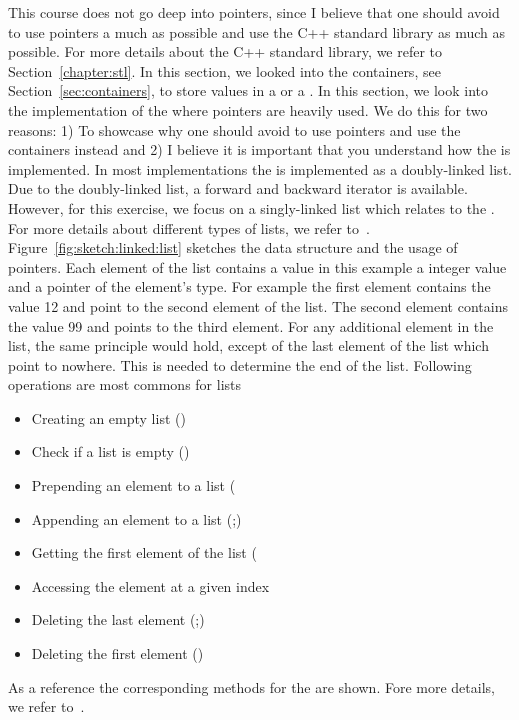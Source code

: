 This course does not go deep into pointers, since I believe that one should avoid to use pointers a much as possible and use the C++ standard library as much as possible. For more details about the C++ standard library, we refer to Section~\ref{chapter:stl}. In this section, we looked into the containers, see Section~\ref{sec:containers}, to store values in a  or a . In this section, we look into the implementation of the  where pointers are heavily used. We do this for two reasons: 1) To showcase why one should avoid to use pointers and use the containers instead and 2) I believe it is important that you understand how the  is implemented. In most implementations the  is implemented as a doubly-linked list. Due to the doubly-linked list, a forward and backward iterator is available. However, for this exercise, we focus on a singly-linked list which relates to the . For more details about different types of lists, we refer to~\cite{abelson1996structure}. \\

Figure~\ref{fig:sketch:linked:list} sketches the data structure and the usage of pointers. Each element of the list contains a value in this example a integer value and a pointer of the element's type. For example the first element contains the value 12 and point to the second element of the list. The second element contains the value 99 and points to the third element. For any additional element in the list, the same principle would hold, except of the last element of the list which point to nowhere. This is needed to determine the end of the list. Following operations are most commons for lists
\vspace{0.25cm}
\begin{itemize}
\item Creating an empty list ()
\item Check if a list is empty ()
\item Prepending an element to a list (
\item Appending an element to a list (;)
\item Getting the first element of the list (
\item Accessing the element at a given index 
\item Deleting the last element (;)
\item Deleting the first element ()
\end{itemize}
\vspace{0.25cm}
As a reference the corresponding methods for the  are shown. Fore more details, we refer to~\cite[Chapter 2]{knuth1997art}.

